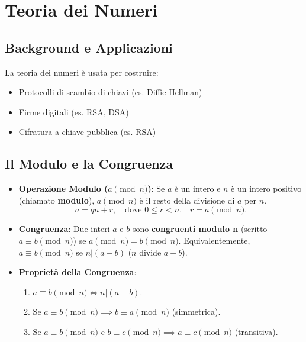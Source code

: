\begin{itemize}
\begin{center}
    \end{center}
\end{itemize}

\section{Teoria dei Numeri}

\subsection{Background e Applicazioni}
La teoria dei numeri è usata per costruire:
\begin{itemize}
    \item Protocolli di scambio di chiavi (es. Diffie-Hellman)
    \item Firme digitali (es. RSA, DSA)
    \item Cifratura a chiave pubblica (es. RSA)
\end{itemize}

\subsection{Il Modulo e la Congruenza}
\begin{itemize}
    \item \textbf{Operazione Modulo ($a \pmod n$)}: Se $a$ è un intero e $n$ è un intero positivo (chiamato \textbf{modulo}), $a \pmod n$ è il resto della divisione di $a$ per $n$.
    \[ a = qn + r, \quad \text{dove } 0 \le r < n. \quad r = a \pmod n. \]
    \item \textbf{Congruenza}: Due interi $a$ e $b$ sono \textbf{congruenti modulo n} (scritto $a \equiv b \pmod n$) se $a \pmod n = b \pmod n$.
    Equivalentemente, $a \equiv b \pmod n$ se $n | (a-b)$ ($n$ divide $a-b$).
    \item \textbf{Proprietà della Congruenza}:
    \begin{enumerate}
        \item $a \equiv b \pmod n \iff n | (a-b)$.
        \item Se $a \equiv b \pmod n \implies b \equiv a \pmod n$ (simmetrica).
        \item Se $a \equiv b \pmod n$ e $b \equiv c \pmod n \implies a \equiv c \pmod n$ (transitiva).
    \end{enumerate}
\end{itemize}


